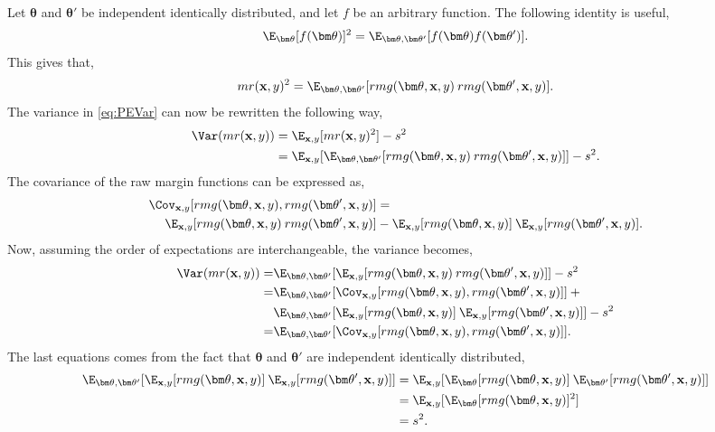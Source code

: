 Let $\bm \theta$ and $\bm \theta'$ be independent identically distributed, and let $f$ be an arbitrary function. The following identity is useful,
\begin{align}
  \E_{\bm \theta}[f(\bm \theta)]^2 = \E_{\bm \theta, \bm \theta'}[f(\bm \theta) f(\bm \theta')]. 
\end{align}
This gives that,
\begin{align}
  mr(\mathbf{x}, y)^2  = \E_{\bm \theta, \bm \theta'}[rmg(\bm \theta, \mathbf{x}, y) \: rmg(\bm \theta', \mathbf{x}, y)]. 
\end{align}
The variance in \eqref{eq:PEVar} can now be rewritten the following way,
\begin{align}
  \Var(mr(\mathbf{x}, y)) 
  &= \E_{\mathbf{x}, y}[mr(\mathbf{x}, y)^2] - s^2 \notag \\
  &= \E_{\mathbf{x}, y}[ \E_{\bm \theta, \bm \theta'}[rmg(\bm \theta, \mathbf{x}, y) \: rmg(\bm \theta', \mathbf{x}, y)]] - s^2.
\end{align}
The covariance of the raw margin functions can be expressed as,
\begin{align}
  \Cov_{\mathbf{x}, y} [rmg(\bm \theta, \mathbf{x}, y), rmg(\bm \theta', \mathbf{x}, y)] &= \notag \\
  \E_{\mathbf{x}, y} [rmg(\bm \theta, \mathbf{x}, y) \: rmg(\bm \theta', \mathbf{x}, y)] &-
  \E_{\mathbf{x}, y} [rmg(\bm \theta, \mathbf{x}, y)]\: \E_{\mathbf{x}, y} [rmg(\bm \theta', \mathbf{x}, y)].
\end{align}
Now, assuming the order of expectations are interchangeable, the variance becomes,
\begin{align}
  \Var(mr(\mathbf{x}, y)) 
  = &\E_{\bm \theta, \bm \theta'}[\E_{\mathbf{x}, y}[ rmg(\bm \theta, \mathbf{x}, y) \: rmg(\bm \theta', \mathbf{x}, y)]] - s^2 \notag \\
  = &\E_{\bm \theta, \bm \theta'}[\Cov_{\mathbf{x}, y} [rmg(\bm \theta, \mathbf{x}, y), rmg(\bm \theta', \mathbf{x}, y)]] \: +\notag \\
    &\E_{\bm \theta, \bm \theta'} [\E_{\mathbf{x}, y} [rmg(\bm \theta, \mathbf{x}, y)]\: \E_{\mathbf{x}, y} [rmg(\bm \theta', \mathbf{x}, y)]]
  - s^2 \notag \\
  \label{eq:VarCovRF} 
  = &\E_{\bm \theta, \bm \theta'}[\Cov_{\mathbf{x}, y} [rmg(\bm \theta, \mathbf{x}, y), rmg(\bm \theta', \mathbf{x}, y)]].
\end{align}
The last equations comes from the fact that $\bm \theta$ and $\bm \theta'$ are independent identically distributed,
\begin{align}
  \E_{\bm \theta, \bm \theta'} [\E_{\mathbf{x}, y} [rmg(\bm \theta, \mathbf{x}, y)]\: \E_{\mathbf{x}, y} [rmg(\bm \theta', \mathbf{x}, y)]] 
  &= \E_{\mathbf{x}, y} [\E_{\bm \theta} [rmg(\bm \theta, \mathbf{x}, y)] \: \E_{\bm \theta'}[rmg(\bm \theta', \mathbf{x}, y)]] \notag \\
  &= \E_{\mathbf{x}, y} [\E_{\bm \theta} [rmg(\bm \theta, \mathbf{x}, y)]^2]  \notag \\
  &= s^2.
\end{align}
